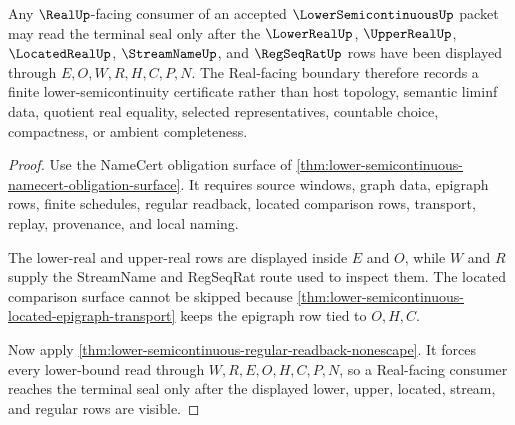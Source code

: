\begin{theorem}
\label{thm:lower-semicontinuous-real-seal-boundary}
Any $\RealUp$-facing consumer of an accepted $\LowerSemicontinuousUp$ packet
may read the terminal seal only after the $\LowerRealUp$, $\UpperRealUp$,
$\LocatedRealUp$, $\StreamNameUp$, and $\RegSeqRatUp$ rows have been displayed
through $E,O,W,R,H,C,P,N$. The Real-facing boundary therefore records a
finite lower-semicontinuity certificate rather than host topology, semantic
liminf data, quotient real equality, selected representatives, countable
choice, compactness, or ambient completeness.
\end{theorem}
\begin{proof}
Use the NameCert obligation surface of
\autoref{thm:lower-semicontinuous-namecert-obligation-surface}. It requires
source windows, graph data, epigraph rows, finite schedules, regular readback,
located comparison rows, transport, replay, provenance, and local naming.

The lower-real and upper-real rows are displayed inside $E$ and $O$, while
$W$ and $R$ supply the StreamName and RegSeqRat route used to inspect them.
The located comparison surface cannot be skipped because
\autoref{thm:lower-semicontinuous-located-epigraph-transport} keeps the
epigraph row tied to $O,H,C$.

Now apply
\autoref{thm:lower-semicontinuous-regular-readback-nonescape}. It forces every
lower-bound read through $W,R,E,O,H,C,P,N$, so a Real-facing consumer reaches
the terminal seal only after the displayed lower, upper, located, stream, and
regular rows are visible.
\end{proof}

